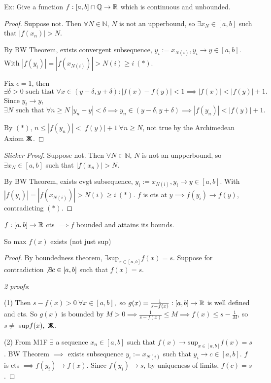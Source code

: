 \documentclass[twoside]{scrartcl}
\newcommand*{\cont}{%
  \mathsf{X}\mkern-8.5mu\mathsf{X}%
}
\begin{document}
Ex: Give a function $f: [a,b] \cap \mathbb{Q} \to \mathbb{R}$ which is continuous and unbounded. 

\begin{proof}[Proof]
Suppose not. Then $\forall N \in \mathbb{N}$, $N$ is not an upperbound, so $\exists x_N \in [a,b]$ such that $|f(x_n)| > N$.

By BW Theorem, exists convergent subsequence, $y_i := x_{N(i)}, y_i \to y \in [a,b]$. With $|f(y_i)| = |f(x_{N(i)})| > N(i) \geq i ~(*)$. 

Fix $\epsilon =1$, then 
\[\exists \delta > 0\text{ such that }\forall x \in (y-\delta, y + \delta): |f(x) - f(y)| < 1 \implies |f(x)| < |f(y)| +1.\]
 Since $y_i \to y$, 
 \[\exists N\text{ such that }\forall n \geq N~ |y_n - y| < \delta \implies y_n \in (y-\delta, y + \delta) \implies |f(y_n)| < |f(y)| + 1.\]
 
 By $(*)$, $n \leq |f(y_n)| < |f(y)| + 1~ \forall n \geq N$, not true by the Archimedean Axiom $\cont$.
\end{proof}

\begin{proof}[Slicker Proof]
	Suppose not. Then $\forall N \in \mathbb{N}$, $N$ is not an unpperbound, so $\exists x_N \in [a,b]$ such that $|f(x_n)| > N$.
	
By BW Theorem, exists cvgt subsequence, $y_i := x_{N(i)}, y_i \to y \in [a,b]$. With $|f(y_i)| = |f(x_{N(i)})| > N(i) \geq i ~(*)$. $f$ is cts at $y \implies f(y_i) \to f(y)$, contradicting $(*)$.  
\end{proof}

\vspace*{10pt}
\begin{theorem} $f: [a,b] \to \mathbb{R}$ cts $\implies f$ bounded and attains its bounds.
\end{theorem}

So max $f(x)$ exists (not just sup)

\begin{proof}[Proof]
	By boundedness theorem, $\exists \displaystyle{\text{sup}_{x \in [a,b]}} f(x) = s$. Suppose for contradiction $\not \exists c \in [a,b]$ such that $f(x) = s$. 
	
	\emph{2 proofs}:
	
	(1) Then $s-f(x) > 0 ~\forall x \in [a,b],$ so $g(x) = \frac{1}{s-f(x)}: [a,b] \to \mathbb{R}$ is well defined and cts. So $g(x)$ is bounded by $M > 0 \implies \frac{1}{s-f(x)} \leq M \implies f(x) \leq s - \frac{1}{M}$, so $s \neq$ sup$f(x),~\cont$.\vspace*{10pt}

	(2) From M1F $\exists$ a sequence $x_n \in [a,b]$ such that $f(x) \to  \displaystyle{\text{sup}_{x \in [a,b]}} f(x) = s$. BW Theorem $\implies$ exists subsequence $y_i := x_{N(i)}$ such that $y_i \to c \in [a,b].$ $f$ is cts $\implies f(y_i) \to f(x)$. Since $f(y_i) \to s$, by uniqueness of limits, $f(c) = s$.
	\end{proof}
	
\end{document}

